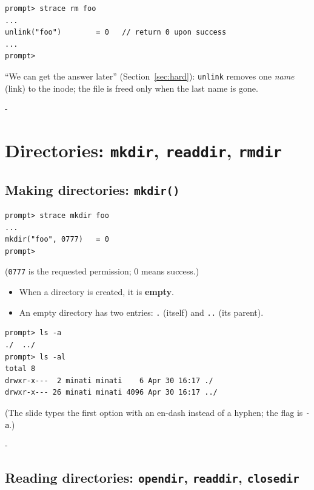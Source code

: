 \documentclass[11pt,a4paper]{article}
\makeatletter
\newcommand{\keepspace}[1]{\par\penalty-100\begingroup
  \setlength{\dimen@}{#1}\dimen@ii\pagegoal\advance\dimen@ii-\pagetotal
  \ifdim\dimen@>\dimen@ii\ifdim\dimen@ii>\z@\vfil\fi\break\fi\endgroup}
\makeatother
\begin{document}
\begin{lstlisting}[style=term]
prompt> strace rm foo
...
unlink("foo")        = 0   // return 0 upon success
...
prompt>
\end{lstlisting}

\begin{quizbox}
``We can get the answer later'' (Section~\ref{sec:hard}): \texttt{unlink}
removes one \emph{name} (link) to the inode; the file is freed only when the
last name is gone.
\end{quizbox}

\keepspace{7\baselineskip}
\section{Directories: \texttt{mkdir}, \texttt{readdir}, \texttt{rmdir}}\label{sec:dirs}

\subsection{Making directories: \texttt{mkdir()}}

\begin{lstlisting}[style=term]
prompt> strace mkdir foo
...
mkdir("foo", 0777)   = 0
prompt>
\end{lstlisting}

(\texttt{0777} is the requested permission; 0 means success.)

\begin{itemize}
  \item When a directory is created, it is \textbf{empty}.
  \item An empty directory has two entries: \texttt{.} (itself) and
        \texttt{..} (its parent).
\end{itemize}

\begin{lstlisting}[style=term]
prompt> ls -a
./  ../
prompt> ls -al
total 8
drwxr-x---  2 minati minati    6 Apr 30 16:17 ./
drwxr-x--- 26 minati minati 4096 Apr 30 16:17 ../
\end{lstlisting}
{\small (The slide types the first option with an en-dash instead of a
hyphen; the flag is \texttt{-a}.)}

\keepspace{18\baselineskip}
\subsection{Reading directories: \texttt{opendir}, \texttt{readdir}, \texttt{closedir}}
\end{document}
